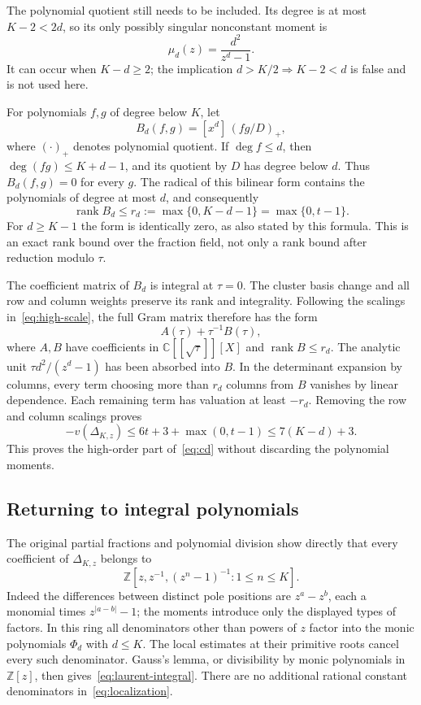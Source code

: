 \documentclass[11pt]{article}
\theoremstyle{remark}
\newcommand{\Z}{\mathbb Z}
\newcommand{\C}{\mathbb C}
\newcommand{\rank}{\operatorname{rank}}
\begin{document}
The polynomial quotient still needs to be included. Its degree is at
most $K-2<2d$, so its only possibly singular nonconstant moment is
\[
 \mu_d(z)=\frac{d^2}{z^d-1}.
\]
It can occur when $K-d\ge2$; the implication $d>K/2\Rightarrow K-2<d$
is false and is not used here.

For polynomials $f,g$ of degree below $K$, let
\[
 B_d(f,g)=[x^d]\,(fg/D)_+,
\]
where $(\cdot)_+$ denotes polynomial quotient. If $\deg f\le d$, then
$\deg(fg)\le K+d-1$, and its quotient by $D$ has degree below $d$.
Thus $B_d(f,g)=0$ for every $g$. The radical of this bilinear form
contains the polynomials of degree at most $d$, and consequently
\begin{equation}\label{eq:rank}
 \rank B_d\le r_d:=\max\{0,K-d-1\}=\max\{0,t-1\}.
\end{equation}
For $d\ge K-1$ the form is identically zero, as also stated by this
formula. This is an exact rank bound over the fraction field, not only
a rank bound after reduction modulo $\tau$.

The coefficient matrix of $B_d$ is integral at $\tau=0$. The cluster
basis change and all row and column weights preserve its rank and
integrality. Following the scalings in~\eqref{eq:high-scale}, the full
Gram matrix therefore has the form
\[
 A(\tau)+\tau^{-1}B(\tau),
\]
where $A,B$ have coefficients in $\C[[\sqrt\tau]][X]$ and
$\rank B\le r_d$. The analytic unit
$\tau d^2/(z^d-1)$ has been absorbed into $B$.
In the determinant expansion by columns, every term choosing more
than $r_d$ columns from $B$ vanishes by linear dependence. Each
remaining term has valuation at least $-r_d$. Removing the row and
column scalings proves
\begin{equation}\label{eq:high-order}
 -v(\Delta_{K,z})\le6t+3+\max(0,t-1)\le7(K-d)+3.
\end{equation}
This proves the high-order part of~\eqref{eq:cd} without discarding
the polynomial moments.

\subsection{Returning to integral polynomials}

The original partial fractions and polynomial division show directly
that every coefficient of $\Delta_{K,z}$ belongs to
\begin{equation}\label{eq:localization}
 \Z[z,z^{-1},(z^n-1)^{-1}:1\le n\le K].
\end{equation}
Indeed the differences between distinct pole positions are
$z^a-z^b$, each a monomial times $z^{|a-b|}-1$; the moments introduce
only the displayed types of factors. In this ring all denominators
other than powers of $z$ factor into the monic polynomials $\Phi_d$
with $d\le K$. The local estimates at their primitive roots cancel
every such denominator. Gauss's lemma, or divisibility by monic
polynomials in $\Z[z]$, then gives~\eqref{eq:laurent-integral}. There
are no additional rational constant denominators in~\eqref{eq:localization}.
\end{document}

